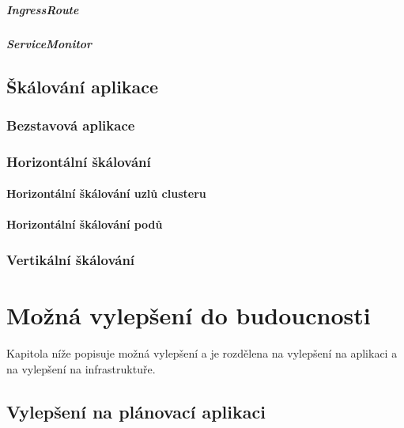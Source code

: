 \documentclass[thesis=M,czech]{FITthesis}[2019/12/23]
\theoremstyle{plain}
\theoremstyle{definition}
\begin{document}
\paragraph{IngressRoute}
\paragraph{ServiceMonitor}

\section{Škálování aplikace}


\subsection{Bezstavová aplikace}


\subsection{Horizontální škálování}
\subsubsection{Horizontální škálování uzlů clusteru}
\subsubsection{Horizontální škálování podů}

\subsection{Vertikální škálování}



\chapter{Možná vylepšení do budoucnosti}
Kapitola níže popisuje možná vylepšení a je rozdělena na vylepšení na aplikaci a na vylepšení na infrastruktuře.

\section{Vylepšení na plánovací aplikaci}
\end{document}
